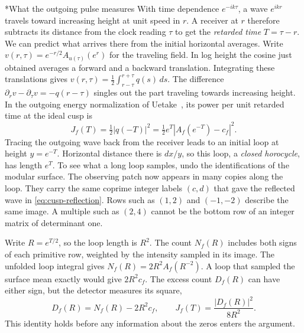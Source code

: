 \documentclass[11pt,letterpaper]{article}
\makeatletter
\renewcommand\subsection{\@startsection{subsection}{2}{\z@}{-2.0ex plus -.3ex}{.75ex}{\normalfont\normalsize\itshape}}
\numberwithin{equation}{section}
\makeatother
\begin{document}
\subsection*{What the outgoing pulse measures}
With time dependence $e^{-ik\tau}$, a wave $e^{ikr}$ travels toward increasing height at unit speed in $r$. A receiver at $r$ therefore subtracts its distance from the clock reading $\tau$ to get the \emph{retarded time} $T=\tau-r$. We can predict what arrives there from the initial horizontal averages. Write $v(r,\tau)=e^{-r/2}A_{u(\tau)}(e^r)$ for the traveling field. In log height the cosine just obtained averages a forward and a backward translation. Integrating these translations gives $v(r,\tau)=\tfrac12\int_{r-\tau}^{r+\tau}q(s)\,ds$. The difference $\partial_r v-\partial_\tau v=-q(r-\tau)$ singles out the part traveling towards increasing height. In the outgoing energy normalization of Uetake~\cite[\S5]{uetake}, its power per unit retarded time at the ideal cusp is
\begin{equation}
 J_f(T)=\tfrac12|q(-T)|^2
       =\tfrac12 e^T\left|A_f(e^{-T})-c_f\right|^2 .
 \label{eq:loop-flux}
\end{equation}
Tracing the outgoing wave back from the receiver leads to an initial loop at height $y=e^{-T}$. Horizontal distance there is $dx/y$, so this loop, a \emph{closed horocycle}, has length $e^T$. To see what a long loop samples, undo the identifications of the modular surface. The observing patch now appears in many copies along the loop. They carry the same coprime integer labels $(c,d)$ that gave the reflected wave in \eqref{eq:cusp-reflection}. Rows such as $(1,2)$ and $(-1,-2)$ describe the same image. A multiple such as $(2,4)$ cannot be the bottom row of an integer matrix of determinant one.

Write $R=e^{T/2}$, so the loop length is $R^2$. The count $N_f(R)$ includes both signs of each primitive row, weighted by the intensity sampled in its image. The unfolded loop integral gives $N_f(R)=2R^2 A_f(R^{-2})$. A loop that sampled the surface mean exactly would give $2R^2c_f$. The excess count $D_f(R)$ can have either sign, but the detector measures its square,
\begin{equation}
 D_f(R)=N_f(R)-2R^2c_f,\qquad
 J_f(T)=\frac{|D_f(R)|^2}{8R^2}.
 \label{eq:primitive-flux}
\end{equation}
This identity holds before any information about the zeros enters the argument.
\end{document}
